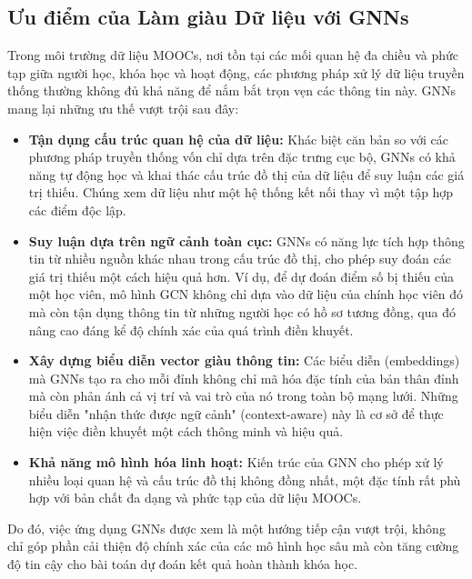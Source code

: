 \subsection{Ưu điểm của Làm giàu Dữ liệu với GNNs}
Trong môi trường dữ liệu MOOCs, nơi tồn tại các mối quan hệ đa chiều và phức tạp giữa người học, khóa học và hoạt động, các phương pháp xử lý dữ liệu truyền thống thường không đủ khả năng để nắm bắt trọn vẹn các thông tin này. GNNs mang lại những ưu thế vượt trội sau đây:
\begin{itemize}
    \item \textbf{Tận dụng cấu trúc quan hệ của dữ liệu:} Khác biệt căn bản so với các phương pháp truyền thống vốn chỉ dựa trên đặc trưng cục bộ, GNNs có khả năng tự động học và khai thác cấu trúc đồ thị của dữ liệu để suy luận các giá trị thiếu. Chúng xem dữ liệu như một hệ thống kết nối thay vì một tập hợp các điểm độc lập.
    
    \item \textbf{Suy luận dựa trên ngữ cảnh toàn cục:} GNNs có năng lực tích hợp thông tin từ nhiều nguồn khác nhau trong cấu trúc đồ thị, cho phép suy đoán các giá trị thiếu một cách hiệu quả hơn. Ví dụ, để dự đoán điểm số bị thiếu của một học viên, mô hình GCN không chỉ dựa vào dữ liệu của chính học viên đó mà còn tận dụng thông tin từ những người học có hồ sơ tương đồng, qua đó nâng cao đáng kể độ chính xác của quá trình điền khuyết.

    \item \textbf{Xây dựng biểu diễn vector giàu thông tin:} Các biểu diễn (embeddings) mà GNNs tạo ra cho mỗi đỉnh không chỉ mã hóa đặc tính của bản thân đỉnh mà còn phản ánh cả vị trí và vai trò của nó trong toàn bộ mạng lưới. Những biểu diễn "nhận thức được ngữ cảnh" (context-aware) này là cơ sở để thực hiện việc điền khuyết một cách thông minh và hiệu quả.
    
    \item \textbf{Khả năng mô hình hóa linh hoạt:} Kiến trúc của GNN cho phép xử lý nhiều loại quan hệ và cấu trúc đồ thị không đồng nhất, một đặc tính rất phù hợp với bản chất đa dạng và phức tạp của dữ liệu MOOCs.
\end{itemize}
Do đó, việc ứng dụng GNNs được xem là một hướng tiếp cận vượt trội, không chỉ góp phần cải thiện độ chính xác của các mô hình học sâu mà còn tăng cường độ tin cậy cho bài toán dự đoán kết quả hoàn thành khóa học.
